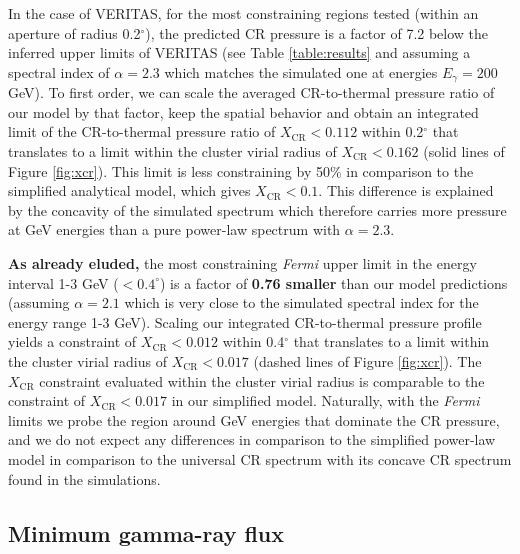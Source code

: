 \documentclass[12pt,manuscript]{aastex}
\def\Fermi{{\em Fermi}\xspace}
\newcommand{\CR}{\mathrm{CR}}
\begin{document}
In the case of VERITAS, for the most constraining regions tested (within an aperture of radius
0.2$^{\circ}$), the predicted CR pressure is a factor of 7.2 below the inferred upper limits of
VERITAS (see Table \ref{table:results} and assuming a spectral index of $\alpha=2.3$ which matches
the simulated one at energies $E_\gamma=200$ GeV). To first order, we can scale the averaged
CR-to-thermal pressure ratio of our model by that factor, keep the spatial behavior and obtain an
integrated limit of the CR-to-thermal pressure ratio of $X_{\CR}<0.112$ within 0.2$^{\circ}$ that
translates to a limit within the cluster virial radius of $X_\CR<0.162$ (solid lines of Figure
\ref{fig:xcr}). This limit is less constraining by 50\% in comparison to the simplified analytical
model, which gives $X_\CR<0.1$. This difference is explained by the concavity of the simulated
spectrum which therefore carries more pressure at GeV energies than a pure power-law spectrum with
$\alpha=2.3$.

{\bf As already eluded,} the most constraining \Fermi upper limit in the energy interval 1-3 GeV
($<0.4^\circ$) is a factor of {\bf 0.76 smaller} than our model predictions (assuming $\alpha=2.1$
which is very close to the simulated spectral index for the energy range 1-3 GeV). Scaling our
integrated CR-to-thermal pressure profile yields a constraint of $X_{\CR}<0.012$ within
0.4$^{\circ}$ that translates to a limit within the cluster virial radius of $X_\CR<0.017$ (dashed
lines of Figure \ref{fig:xcr}). The $X_\CR$ constraint evaluated within the cluster virial radius is
comparable to the constraint of $X_\CR<0.017$ in our simplified model. Naturally, with the \Fermi
limits we probe the region around GeV energies that dominate the CR pressure, and we do not expect
any differences in comparison to the simplified power-law model in comparison to the universal CR
spectrum with its concave CR spectrum found in the simulations.

%
%

\subsection{Minimum gamma-ray flux}
\label{sec:Fmin}
\end{document}
